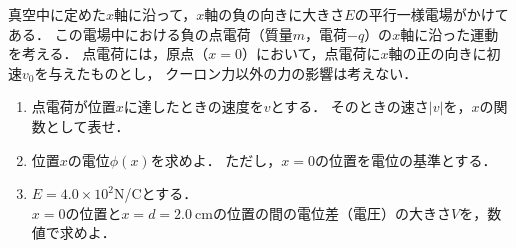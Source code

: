 \documentclass[../../../uem_phy_std_q.tex]{subfiles}
\begin{document}
    真空中に定めた$x$軸に沿って，$x$軸の負の向きに大きさ$E$の平行一様電場がかけてある．%
    この電場中における負の点電荷（質量$m$，電荷$-q$）の$x$軸に沿った運動を考える．%
    点電荷には，原点（$x=0$）において，点電荷に$x$軸の正の向きに初速$v_0$を与えたものとし，%
    クーロン力以外の力の影響は考えない．

    \begin{enumerate}
        \item%
            点電荷が位置$x$に達したときの速度を$v$とする．%
            そのときの速さ$|v|$を，$x$の関数として表せ．
        \item%
            位置$x$の電位$\phi(x)$を求めよ．%
            ただし，$x=0$の位置を電位の基準とする．
        \item%
            $E=4.0 \times 10^2$\:N/Cとする．\\    
            $x=0$の位置と$x=d=2.0\:\mathrm{cm}$の位置の間の電位差（電圧）の大きさ$V$を，数値で求めよ．
    \end{enumerate}
\end{document}

